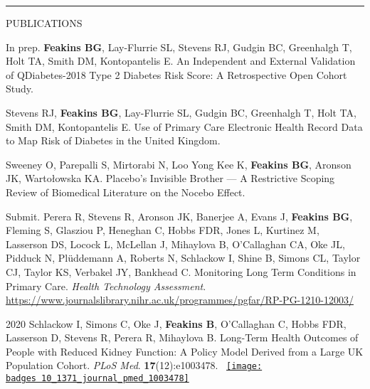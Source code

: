 \documentclass[10pt,a4paper]{article}
\def\badges{./badges/}
\begin{document}
\noindent\rule{\textwidth}{0.4pt}
\begin{cvlist}{PUBLICATIONS}
	
	\item[In prep.]
	\textbf{Feakins BG}, Lay-Flurrie SL, Stevens RJ, Gudgin BC, Greenhalgh T, Holt TA, Smith DM, Kontopantelis E. An Independent and External Validation of QDiabetes-2018 Type 2 Diabetes Risk Score: A Retrospective Open Cohort Study.
	
	\item[]
	Stevens RJ, \textbf{Feakins BG}, Lay-Flurrie SL, Gudgin BC, Greenhalgh T, Holt TA, Smith DM, Kontopantelis E. Use of Primary Care Electronic Health Record Data to Map Risk of Diabetes in the United Kingdom.
	
	\item[]
	Sweeney O, Parepalli S, Mirtorabi N, Loo Yong Kee K, \textbf{Feakins BG}, Aronson JK, Warto\l{}owska KA. Placebo’s Invisible Brother --- A Restrictive Scoping Review of Biomedical Literature on the Nocebo Effect.
	
	\item[Submit.]
	Perera R, Stevens R, Aronson JK, Banerjee A, Evans J, \textbf{Feakins BG}, Fleming S, Glasziou P, Heneghan C, Hobbs FDR, Jones L, Kurtinez M, Lasserson DS, Locock L, McLellan J, Mihaylova B, O'Callaghan CA, Oke JL, Pidduck N, Pl\"uddemann A, Roberts N, Schlackow I, Shine B, Simons CL, Taylor CJ, Taylor KS, Verbakel JY, Bankhead C. Monitoring Long Term Conditions in Primary Care. \textit{Health Technology Assessment}. \url{https://www.journalslibrary.nihr.ac.uk/programmes/pgfar/RP-PG-1210-12003/}
	
	\begin{comment}
	\item[Accept.]
	Warto\l{}owska KA, Irving F, DeVito N, \textbf{Feakins BG}, Curtis H, Bacon S, Smeeth L, Heneghan C, Goldacre B. RetractoBot: A Protocol for a Randomised Controlled Trial to Assess the Impact of Notifying Authors that they Have Cited a Retracted Paper. \textit{BMC Med}. \doi{10.6084/m9.figshare.7731665.v1}
	\end{comment}
	
	\item[2020]
	Schlackow I, Simons C, Oke J, \textbf{Feakins B}, O'Callaghan C, Hobbs FDR, Lasserson D, Stevens R, Perera R, Mihaylova B. Long-Term Health Outcomes of People with Reduced Kidney Function: A Policy Model Derived from a Large UK Population Cohort. \textit{PLoS Med}. \textbf{17}(12):e1003478. ~\href{http://www.altmetric.com/details.php?citation_id=96156539}{\texttt{[image: \\badges 10\_1371\_journal\_pmed\_1003478]}}
	

\end{cvlist}
\end{document}
